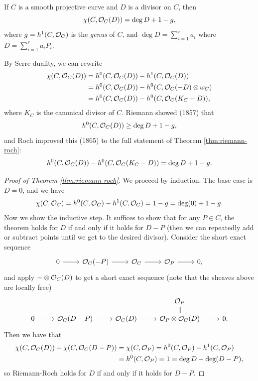 \begin{theorem}\label{thm:riemann-roch}
  If $C$ is a smooth projective curve and
  $D$ is a divisor on $C$, then
  \[
    \chi(C, \mathcal{O}_C(D))
    = \deg D + 1 - g,
  \]
  where $g = h^1(C, \mathcal{O}_C)$ is the
  \emph{genus} of $C$, and
  $\deg D = \sum_{i = 1}^r a_i$ where
  $D = \sum_{i = 1}^r a_i P_i$.
\end{theorem}

\begin{remark}
  By Serre duality, we can rewrite
  \begin{align*}
    \chi(C, \mathcal{O}_C(D))
    &= h^0(C, \mathcal{O}_C(D)) - h^1(C, \mathcal{O}_C(D)) \\
    &= h^0(C, \mathcal{O}_C(D)) - h^0(C, \mathcal{O}_C(-D) \otimes \omega_C) \\
    &= h^0(C, \mathcal{O}_C(D)) - h^0(C, \mathcal{O}_C(K_C - D)),
  \end{align*}
  where $K_C$ is the canonical divisor
  of $C$. Riemann showed (1857) that
  \[
    h^0(C, \mathcal{O}_C(D)) \ge \deg D + 1 - g,
  \]
  and Roch improved this (1865) to
  the full statement of Theorem \ref{thm:riemann-roch}:
  \[
    h^0(C, \mathcal{O}_C(D))
    - h^0(C, \mathcal{O}_C(K_C - D))
    = \deg D + 1 - g.
  \]
\end{remark}

\begin{proof}[Proof of Theorem \ref{thm:riemann-roch}]
  We proceed by induction. The base case is
  $D = 0$, and we have
  \[
    \chi(C, \mathcal{O}_C)
    = h^0(C, \mathcal{O}_C) - h^1(C, \mathcal{O}_C)
    = 1 - g = \deg(0) + 1 - g.
  \]
  Now we show the inductive step. It suffices
  to show that for any $P \in C$, the theorem
  holds for $D$ if and only if it holds for
  $D - P$ (then we can repeatedly add or
  subtract points until we get to the desired
  divisor).
  Consider the short exact sequence
  \[
    \begin{tikzcd}
      0 \ar[r] & \OO_C(-P) \ar[r] & \OO_C \ar[r] & \OO_P \ar[r] & 0,
    \end{tikzcd}
  \]
  and apply $- \otimes \mathcal{O}_C(D)$ to get
  a short exact sequence (note that
  the sheaves above are locally free)
  \[
    \begin{tikzcd}[row sep = small]
      & & & \OO_P \ar[d, equal] \\
      0 \ar[r] & \OO_C(D - P) \ar[r] & \OO_C(D) \ar[r] & \OO_P \otimes \OO_C(D) \ar[r] & 0.
    \end{tikzcd}
  \]
  Then we have that
  \begin{align*}
    \chi(C, \mathcal{O}_C(D))
    - \chi(C, \mathcal{O}_C(D - P))
    &= \chi(C, \mathcal{O}_P)
    = h^0(C, \mathcal{O}_P) - h^1(C, \mathcal{O}_P) \\
    &= h^0(C, \mathcal{O}_P)
    = 1 = \deg D - \deg (D - P),
  \end{align*}
  so Riemann-Roch holds for $D$ if and only if
  it holds for $D - P$.
\end{proof}
